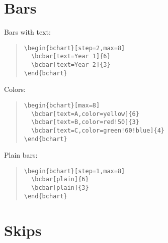 \documentclass{article}
\begin{document}
\section{Bars}

Bars with text:
\begin{quote}\small
\begin{verbatim}
\begin{bchart}[step=2,max=8]
  \bcbar[text=Year 1]{6}
  \bcbar[text=Year 2]{3}
\end{bchart}
\end{verbatim}
\end{quote}
\begin{quote}
\begin{bchart}[step=2,max=8]
\end{bchart}
\end{quote}
Colors:
\begin{quote}\small
\begin{verbatim}
\begin{bchart}[max=8]
  \bcbar[text=A,color=yellow]{6}
  \bcbar[text=B,color=red!50]{3}
  \bcbar[text=C,color=green!60!blue]{4}
\end{bchart}
\end{verbatim}
\end{quote}
\begin{quote}
\begin{bchart}[max=8]
\end{bchart}
\end{quote}
Plain bars:
\begin{quote}\small
\begin{verbatim}
\begin{bchart}[step=1,max=8]
  \bcbar[plain]{6}
  \bcbar[plain]{3}
\end{bchart}
\end{verbatim}
\end{quote}
\begin{quote}
\begin{bchart}[step=1,max=8]
\end{bchart}
\end{quote}


\section{Skips}
\end{document}
